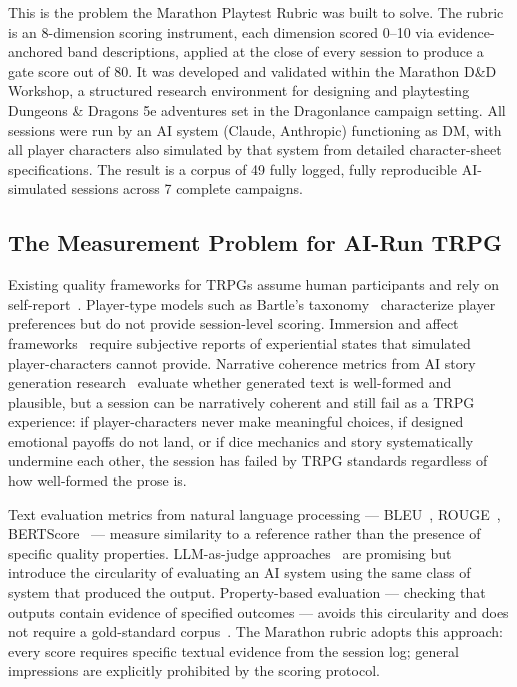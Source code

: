 This is the problem the Marathon Playtest Rubric was built to solve. The rubric is an
8-dimension scoring instrument, each dimension scored 0--10 via evidence-anchored
band descriptions, applied at the close of every session to produce a gate score out
of 80. It was developed and validated within the Marathon D\&D Workshop, a structured
research environment for designing and playtesting Dungeons \& Dragons 5e adventures
set in the Dragonlance campaign setting. All sessions were run by an AI system
(Claude, Anthropic) functioning as DM, with all player characters also simulated by
that system from detailed character-sheet specifications. The result is a corpus of
49 fully logged, fully reproducible AI-simulated sessions across 7 complete campaigns.

\subsection{The Measurement Problem for AI-Run TRPG}

Existing quality frameworks for TRPGs assume human participants and rely on
self-report~\cite{bowman2010functions, schut2013}. Player-type models such as
Bartle's taxonomy~\cite{bartle1996hearts} characterize player preferences but do not
provide session-level scoring. Immersion and affect frameworks~\cite{mekler2017framework,
calleja2011} require subjective reports of experiential states that simulated
player-characters cannot provide. Narrative coherence metrics from AI story generation
research~\cite{fan2019, ammanabrolu2021, riedl2016} evaluate whether generated text is
well-formed and plausible, but a session can be narratively coherent and still fail as
a TRPG experience: if player-characters never make meaningful choices, if designed
emotional payoffs do not land, or if dice mechanics and story systematically undermine
each other, the session has failed by TRPG standards regardless of how well-formed
the prose is.

Text evaluation metrics from natural language processing --- BLEU~\cite{papineni2002bleu},
ROUGE~\cite{lin2004rouge}, BERTScore~\cite{zhang2019bertscore} --- measure similarity
to a reference rather than the presence of specific quality properties. LLM-as-judge
approaches~\cite{zheng2023judging} are promising but introduce the circularity of
evaluating an AI system using the same class of system that produced the output.
Property-based evaluation --- checking that outputs contain evidence of specified
outcomes --- avoids this circularity and does not require a gold-standard
corpus~\cite{celikyilmaz2020}. The Marathon rubric adopts this approach: every score
requires specific textual evidence from the session log; general impressions are
explicitly prohibited by the scoring protocol.

